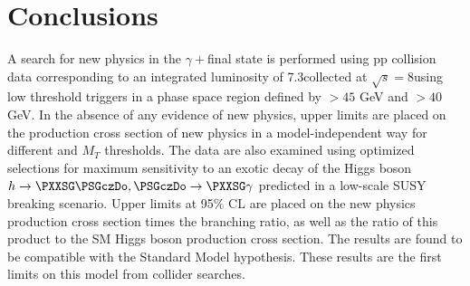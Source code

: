 \section{Conclusions}

  A search for new physics in the $\gamma+$\met final state is performed using pp collision data corresponding to an integrated luminosity of 7.3\fbinv collected at $\sqrt{s}= 8$\TeV using low threshold triggers in a phase space region defined by \et$> 45$ GeV and \met$>40$ GeV. In the absence of any evidence of new physics, upper limits are placed on the production cross section of new physics in a model-independent way for different \met and $M_{T}$ thresholds. The data are also examined using optimized selections for maximum sensitivity to an exotic decay of the Higgs boson $h\to \PXXSG\PSGczDo,\PSGczDo\to\PXXSG\gamma$ predicted in a low-scale SUSY breaking scenario. Upper limits at 95$\%$ CL are placed on the new physics production cross section times the branching ratio, as well as the ratio of this product to the SM Higgs boson production cross section. The results are found to be compatible with the Standard Model hypothesis. These results are the first limits on this model from collider searches.


